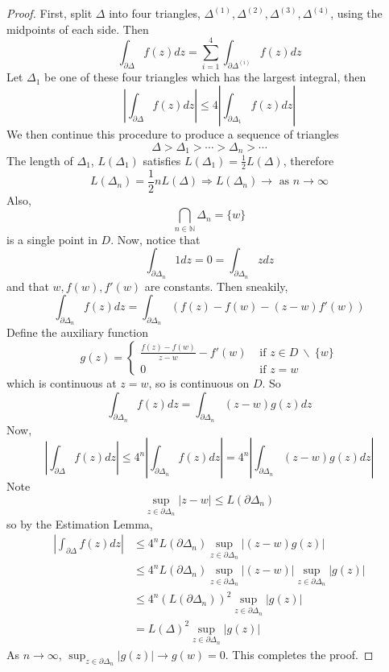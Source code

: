 \begin{proof}
	First, split $\Delta$ into four triangles, $\Delta^{(1)}, \Delta^{(2)}, \Delta^{(3)}, \Delta^{(4)}$, using the midpoints of each side. Then
	\[
		\int_{\partial \Delta} f(z) dz = \sum_{i = 1}^{4} \int_{\partial \Delta^{(i)}} f(z) dz
	\]
	Let $\Delta_1$ be one of these four triangles which has the largest integral, then
	\[
		\left| \int_{\partial \Delta} f(z) dz \right| \le 4 \left| \int_{\partial \Delta_1} f(z) dz \right|
	\]
	We then continue this procedure to produce a sequence of triangles
	\[
		\Delta > \Delta_1 > \cdots > \Delta_n > \cdots
	\]
	The length of $\Delta_1$, $L(\Delta_1)$ satisfies $L(\Delta_1) = \frac{1}{2} L(\Delta)$, therefore
	\[
		L(\Delta_n) = \frac{1}{2} n L(\Delta) \Longrightarrow L(\Delta_n) \rightarrow \text{ as } n \rightarrow \infty
	\]
	Also,
	\[
		\bigcap_{n \in \mathbb{N}} \Delta_n = \{ w \}
	\] is a single point in $D$. Now, notice that
	\[
		\int_{\partial \Delta_n} 1 dz = 0 = \int_{\partial \Delta_n} z dz
	\]
	and that $w, f(w), f'(w)$ are constants. Then sneakily,
	\[
		\int_{\partial \Delta_n} f(z) dz = \int_{\partial \Delta_n} \left( f(z) - f(w) - (z - w) f'(w) \right)
	\]
	Define the auxiliary function
	\[
		g(z) = \begin{cases}
			\frac{f(z) - f(w)}{z - w} - f'(w) & \text{ if } z \in D \ \backslash \ \{ w \} \\
			0 & \text{ if } z = w
		\end{cases}
	\]
	which is continuous at $z = w$, so is continuous on $D$. So
	\[
		\int_{\partial \Delta_n} f(z) dz = \int_{\partial \Delta_n} (z - w) g(z) dz
	\]
	Now,
	\[
		\left| \int_{\partial \Delta} f(z) dz \right| \le 4^n \left| \int_{\partial \Delta_n} f(z) dz \right| = 4^n \left| \int_{\partial \Delta_n} (z - w) g(z) dz \right|
	\]
	Note
	\[
		\sup_{z \in \partial \Delta_n} |z - w| \le L(\partial \Delta_n)
	\]
	so by the Estimation Lemma,
	\[
		\begin{aligned}
			\left| \int_{\partial \Delta} f(z) dz \right| & \le 4^n L(\partial \Delta_n) \sup_{z \in \partial \Delta_n} | (z - w) g(z) | \\
			& \le 4^n L(\partial \Delta_n) \sup_{z \in \partial \Delta_n} | (z - w) | \sup_{z \in \partial \Delta_n} | g(z) | \\
			& \le 4^n {(L(\partial \Delta_n))}^2 \sup_{z \in \partial \Delta_n} | g(z) | \\
			& = {L(\Delta)}^2 \sup_{z \in \partial \Delta_n} | g(z) |
		\end{aligned}
	\]
	As $n \rightarrow \infty$, $\sup_{z \in \partial \Delta_n} | g(z) | \rightarrow g(w) = 0$. This completes the proof.
\end{proof}

